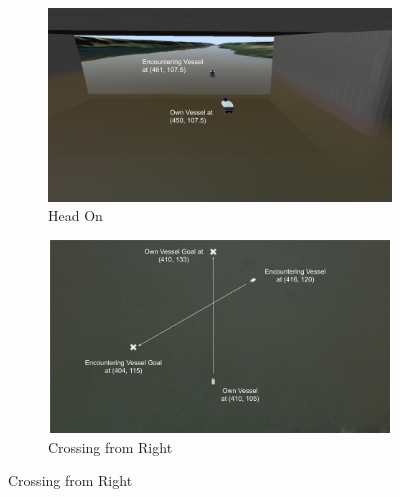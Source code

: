     \begin{figure}[H]
    \centering
    
        \begin{subfigure}[b]{0.495\textwidth}
            \centering
            \includegraphics[width=\textwidth]{figs/Chap5/simulation_uwsim_headon_starting_pos.png}
            \caption{Head On}
            \label{fig:simulation_uwsim_headon_starting_pos}
        \end{subfigure}
        \begin{subfigure}[b]{0.495\textwidth}
            \centering
            \includegraphics[width=\textwidth]{figs/Chap5/simulation_uwsim_crossingright_starting_pos.png}
            \caption{Crossing from Right}
            \label{fig:simulation_uwsim_crossingright_starting_pos}
        \end{subfigure}
        

\end{figure}
